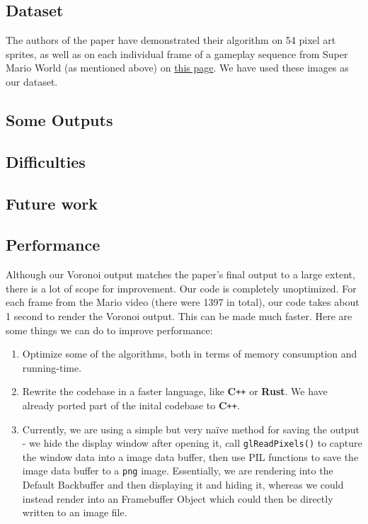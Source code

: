 \documentclass[a4paper,9pt]{article}
\begin{document}
\textcolor{myrust}{\section{Dataset}}

The authors of the paper have demonstrated their algorithm on 54 pixel art sprites, as well as on each individual frame of a gameplay sequence from Super Mario World (as mentioned above) on \href{http://research.microsoft.com/en-us/um/people/kopf/pixelart/supplementary/comparison\_bicubic.html}{this page}. We have used these images as our dataset.

\textcolor{myrust}{\section{Some Outputs}}


\textcolor{myrust}{\section{Difficulties}}

\textcolor{myrust}{\section{Future work}}

\textcolor{myrust}{\subsection{Performance}}

Although our Voronoi output matches the paper's final output to a large extent, there is a lot of scope for improvement. Our code is completely unoptimized. For each frame from the Mario video (there were 1397 in total), our code takes about 1 second to render the Voronoi output. This can be made much faster. Here are some things we can do to improve performance:\\

\begin{enumerate}
  \item Optimize some of the algorithms, both in terms of memory consumption and running-time.
  \item Rewrite the codebase in a faster language, like \textbf{C}\verb!++! or \textbf{Rust}. We have already ported part of the inital codebase to \textbf{C}\verb!++!.
  \item Currently, we are using a simple but very na{\"i}ve method for saving the output - we hide the display window after opening it, call \texttt{glReadPixels()} to capture the window data into a image data buffer, then use PIL functions to save the image data buffer to a \texttt{png} image. Essentially, we are rendering into the Default Backbuffer and then displaying it and hiding it, whereas we could instead render into an Framebuffer Object which could then be directly written to an image file.
\end{enumerate}
\end{document}
